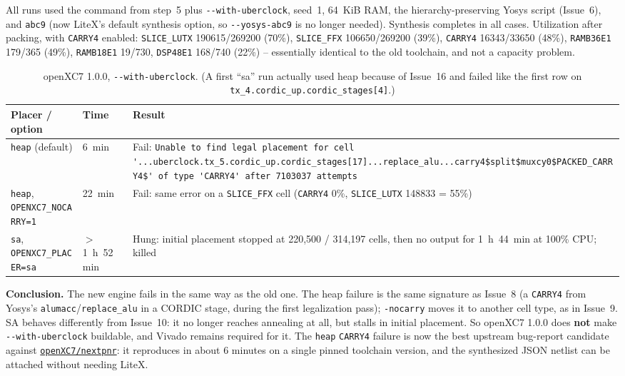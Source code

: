 \documentclass[11pt]{article}
\begin{document}
All runs used the command from step~5 plus \lstinline{--with-uberclock},
seed~1, 64~KiB RAM, the hierarchy-preserving Yosys script (Issue~6), and
\lstinline{abc9} (now LiteX's default synthesis option, so
\lstinline{--yosys-abc9} is no longer needed). Synthesis completes in all
cases. Utilization after packing, with \lstinline{CARRY4} enabled:
\lstinline{SLICE_LUTX} 190615/269200 (70\%), \lstinline{SLICE_FFX}
106650/269200 (39\%), \lstinline{CARRY4} 16343/33650 (48\%),
\lstinline{RAMB36E1} 179/365 (49\%), \lstinline{RAMB18E1} 19/730,
\lstinline{DSP48E1} 168/740 (22\%) -- essentially identical to the old
toolchain, and not a capacity problem.

\begin{table}[H]
\centering
\small
\begin{tabular}{p{}p{}p{}}
\toprule
Placer / option & Time & Result \\
\midrule
\lstinline{heap} (default) & 6~min & Fail: \lstinline{Unable to find legal placement for cell '...uberclock.tx_5.cordic_up.cordic_stages[17]...replace_alu...carry4$split$muxcy0$PACKED_CARRY4$' of type 'CARRY4' after 7103037 attempts} \\
\lstinline{heap}, \lstinline{OPENXC7_NOCARRY=1} & 22~min & Fail: same error on a \lstinline{SLICE_FFX} cell (\lstinline{CARRY4} 0\%, \lstinline{SLICE_LUTX} 148833 = 55\%) \\
\lstinline{sa}, \lstinline{OPENXC7_PLACER=sa} & $>$1~h~52~min & Hung: initial placement stopped at 220{,}500 / 314{,}197 cells, then no output for 1~h~44~min at 100\% CPU; killed \\
\bottomrule
\end{tabular}
\caption{openXC7 1.0.0, \lstinline{--with-uberclock}. (A first ``sa'' run
actually used heap because of Issue~16 and failed like the first row on
\lstinline{tx_4.cordic_up.cordic_stages[4]}.)}
\end{table}

\textbf{Conclusion.} The new engine fails in the same way as the old one.
The heap failure is the same signature as Issue~8 (a \lstinline{CARRY4}
from Yosys's \lstinline{alumacc}/\lstinline{replace_alu} in a CORDIC stage,
during the first legalization pass); \lstinline{-nocarry} moves it to
another cell type, as in Issue~9. SA behaves differently from Issue~10: it
no longer reaches annealing at all, but stalls in initial placement. So
openXC7 1.0.0 does \textbf{not} make \lstinline{--with-uberclock}
buildable, and Vivado remains required for it. The \lstinline{heap}
\lstinline{CARRY4} failure is now the best upstream bug-report candidate
against \href{https://github.com/openXC7/nextpnr}{\texttt{openXC7/nextpnr}}:
it reproduces in about 6 minutes on a single pinned toolchain version, and
the synthesized JSON netlist can be attached without needing LiteX.
\end{document}
